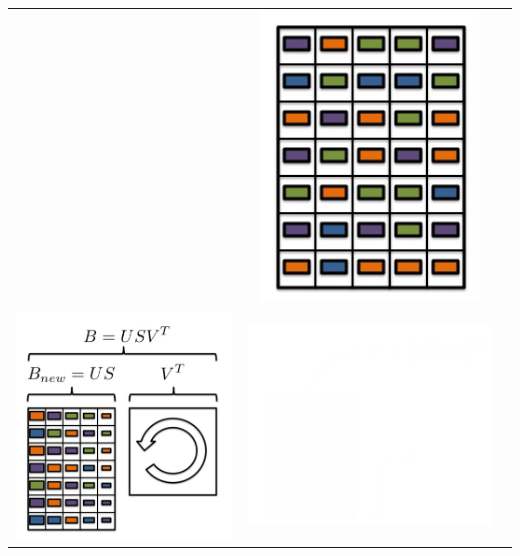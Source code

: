 \documentclass{beamer}
\begin{document}
\begin{frame}
\begin{center}
\begin{tabular}{ccc}
			&  \includegraphics*[scale=0.23]{figures/FD3.png}  \\
			\includegraphics*[scale=0.23]{figures/FD4.png}  
			& \includegraphics*[scale=0.23]{figures/FD5_white.png}  

\end{tabular}
\end{center}
\end{frame}
\end{document}

